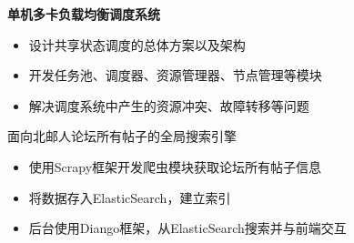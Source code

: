 \documentclass{resume}
\begin{document}
\textbf{单机多卡负载均衡调度系统}
\begin{itemize}
  \item 设计共享状态调度的总体方案以及架构
  \item 开发任务池、调度器、资源管理器、节点管理等模块
  \item 解决调度系统中产生的资源冲突、故障转移等问题
\end{itemize}

\begin{onehalfspacing}
面向北邮人论坛所有帖子的全局搜索引擎
\begin{itemize}
  \item 使用Scrapy框架开发爬虫模块获取论坛所有帖子信息
  \item 将数据存入ElasticSearch，建立索引
  \item 后台使用Diango框架，从ElasticSearch搜索并与前端交互
\end{itemize}
\end{onehalfspacing}



\end{document}
